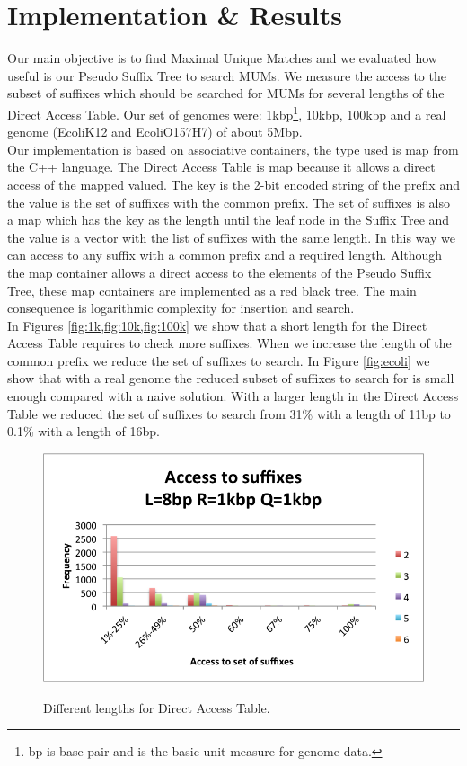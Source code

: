 \documentclass[runningheads,a4paper]{llncs}
\begin{document}
\section{Implementation \& Results}
Our main objective is to find Maximal Unique Matches and we evaluated how useful is our Pseudo Suffix Tree to search MUMs. We measure the access to the subset of suffixes which should be searched for MUMs for several lengths of the Direct Access Table. Our set of genomes were: 1kbp\footnote{bp is base pair and is the basic unit measure for genome data.}, 10kbp, 100kbp and a real genome (EcoliK12 and EcoliO157H7) of about 5Mbp.\\
Our implementation is based on associative containers, the type used is map from the C++ language. The Direct Access Table is map because it allows a direct access of the mapped valued. The key is the 2-bit encoded string of the prefix and the value is the set of suffixes with the common prefix. The set of suffixes is also a map which has the key as the length until the leaf node in the Suffix Tree and the value is a vector with the list of suffixes with the same length. In this way we can access to any suffix with a common prefix and a required length. Although the map container allows a direct access to the elements of the Pseudo Suffix Tree, these map containers are implemented as a red black tree. The main consequence is logarithmic complexity for insertion and search.\\
In Figures \ref{fig:1k,fig:10k,fig:100k} we show that a short length for the Direct Access Table requires to check more suffixes. When we increase the length of the common prefix we reduce the set of suffixes to search. In Figure \ref{fig:ecoli} we show that with a real genome the reduced subset of suffixes to search for is small enough compared with a naive solution. With a larger length in the Direct Access Table we reduced the set of suffixes to search from 31\% with a length of 11bp to 0.1\% with a length of 16bp.\\
\begin{figure}
\centering
\includegraphics[scale=0.5]{1k.png}
\label{fig:1k}
\caption{Different lengths for Direct Access Table.}
\end{figure} 
\end{document}
